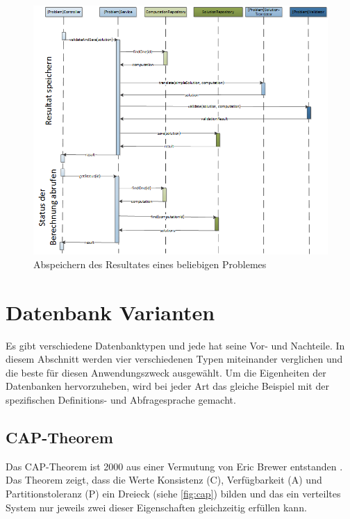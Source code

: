 \begin{figure}[h]
\centering
\includegraphics[scale=0.8]{images/visio/sequenz_diagramm_result.png}
\caption[Abspeichern des Resultates eines beliebigen Problemes]{Abspeichern des Resultates eines beliebigen Problemes \selfmade{}}
\label{fig:sequenz_diagramm_result}
\end{figure}

\section{Datenbank Varianten}\label{db_varianten}
Es gibt verschiedene Datenbanktypen und jede hat seine Vor- und Nachteile. In diesem Abschnitt werden vier verschiedenen Typen miteinander verglichen und die beste für diesen 
Anwendungszweck ausgewählt. Um die Eigenheiten der Datenbanken hervorzuheben, wird bei jeder Art das gleiche Beispiel mit der spezifischen Definitions- und Abfragesprache gemacht.

\subsection{CAP-Theorem}\label{cap_theorem}
Das CAP-Theorem ist 2000 aus einer Vermutung von Eric Brewer entstanden \cite{cap_brewer}. Das Theorem zeigt, dass die Werte Konsistenz (C), Verfügbarkeit (A) und Partitionstoleranz (P) ein 
Dreieck (siehe \autoref{fig:cap}) bilden und das ein verteiltes System nur jeweils zwei dieser Eigenschaften gleichzeitig erfüllen kann.

